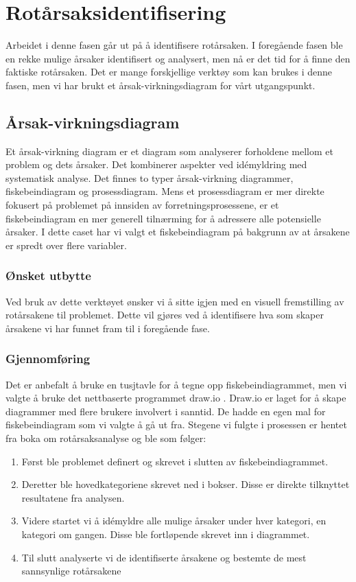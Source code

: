 \chapter{Rotårsaksidentifisering}
Arbeidet i denne fasen går ut på å identifisere rotårsaken. I foregående fasen ble en rekke mulige årsaker identifisert og analysert, men nå er det tid for å finne den faktiske rotårsaken. Det er mange forskjellige verktøy som kan brukes i denne fasen, men vi har brukt et årsak-virkningsdiagram for vårt utgangspunkt.

\section{Årsak-virkningsdiagram}
Et årsak-virkning diagram er et diagram som analyserer forholdene mellom et problem og dets årsaker. Det kombinerer aspekter ved idémyldring med systematisk analyse. Det finnes to typer årsak-virkning diagrammer, fiskebeindiagram og prosessdiagram. Mens et prosessdiagram er mer direkte fokusert på problemet på innsiden av forretningsprosessene, er et fiskebeindiagram en mer generell tilnærming for å adressere alle potensielle årsaker\cite{RCA}. I dette caset har vi valgt et fiskebeindiagram på bakgrunn av at årsakene er spredt over flere variabler. 

\subsection{Ønsket utbytte}
Ved bruk av dette verktøyet ønsker vi å sitte igjen med en visuell fremstilling av rotårsakene til problemet. Dette vil gjøres ved å identifisere hva som skaper årsakene vi har funnet fram til i foregående fase. 

\subsection{Gjennomføring}
Det er anbefalt å bruke en tusjtavle for å tegne opp fiskebeindiagrammet, men vi valgte å bruke det nettbaserte programmet draw.io \cite{drawio}. Draw.io er laget for å skape diagrammer med flere brukere involvert i sanntid. De hadde en egen mal for fiskebeindiagram som vi valgte å gå ut fra. Stegene vi fulgte i prosessen er hentet fra boka om rotårsaksanalyse \cite{RCA} og ble som følger:

\begin{enumerate}
    \item Først ble problemet definert og skrevet i slutten av fiskebeindiagrammet.
    \item Deretter ble hovedkategoriene skrevet ned i bokser. Disse er direkte tilknyttet resultatene fra analysen.
    \item Videre startet vi å idémyldre alle mulige årsaker under hver kategori, en kategori om gangen. Disse ble fortløpende skrevet inn i diagrammet.
    \item Til slutt analyserte vi de identifiserte årsakene og bestemte de mest sannsynlige rotårsakene
\end{enumerate}

